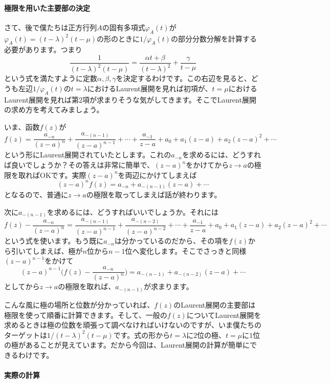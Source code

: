 \paragraph{極限を用いた主要部の決定}

さて、後で僕たちは正方行列$A$の固有多項式$\varphi_A(t)$が$\varphi_A(t) = (t - \lambda)^2 (t - \mu)$の形のときに$1/\varphi_A(t)$の部分分数分解を計算する必要があります。つまり
\[
\frac{1}{(t - \lambda)^2 (t - \mu)} = \frac{\alpha t + \beta}{(t - \lambda)^2} + \frac{\gamma}{t - \mu}
\]
という式を満たすように定数$\alpha, \beta, \gamma$を決定するわけです。この右辺を見ると、どうも左辺$1/\varphi_A(t)$の$t = \lambda$におけるLaurent展開を見れば初項が、$t = \mu$におけるLaurent展開を見れば第$2$項が求まりそうな気がしてきます。そこでLaurent展開の求め方を考えてみましょう。

いま、函数$f(z)$が
\[
f(z) = \frac{a_{-n}}{(z - a)^n} + \frac{a_{-(n - 1)}}{(z - a)^{n - 1}} + \cdots + \frac{a_{-1}}{z - a} + a_0 + a_1 (z - a) + a_2 (z - a)^2 + \cdots
\]
という形にLaurent展開されていたとします。これの$a_{-n}$を求めるには、どうすれば良いでしょうか？その答えは非常に簡単で、$(z - a)^n$をかけてから$z \rightarrow a$の極限を取ればOKです。実際$(z - a)^n$を両辺にかけてしまえば
\[
(z - a)^n f(z) = a_{-n} + a_{-(n - 1)}(z - a) + \cdots
\]
となるので、普通に$z \rightarrow a$の極限を取ってしまえば話が終わります。

次に$a_{-(n - 1)}$を求めるには、どうすればいいでしょうか。それには
\[
f(z) - \frac{a_{-n}}{(z - a)^n} = \frac{a_{-(n - 1)}}{(z - a)^{n - 1}} + \frac{a_{-(n - 2)}}{(z - a)^{n - 2}} + \cdots + \frac{a_{-1}}{z - a} + a_0 + a_1 (z - a) + a_2 (z - a)^2 + \cdots
\]
という式を使います。もう既に$a_{-n}$は分かっているのだから、その項を$f(z)$から引いてしまえば、極が$n$位から$n - 1$位へ変化します。そこでさっきと同様$(z - a)^{n - 1}$をかけて
\[
(z - a)^{n - 1} \biggl(f(z) - \frac{a_{-n}}{(z - a)^n}\biggr) = a_{-(n - 1)} + a_{-(n - 2)} (z - a) + \cdots
\]
としてから$z \rightarrow a$の極限を取れば、$a_{-(n - 1)}$が求まります。

こんな風に極の場所と位数が分かっていれば、$f(z)$のLaurent展開の主要部は極限を使って順番に計算できます。そして、一般の$f(z)$についてLaurent展開を求めるときは極の位数を頑張って調べなければいけないのですが、いま僕たちのターゲットは$1/(t - \lambda)^2 (t - \mu)$です。式の形から$t = \lambda$に$2$位の極、$t = \mu$に$1$位の極があることが見えています。だから今回は、Laurent展開の計算が簡単にできるわけです。

\paragraph{実際の計算}


